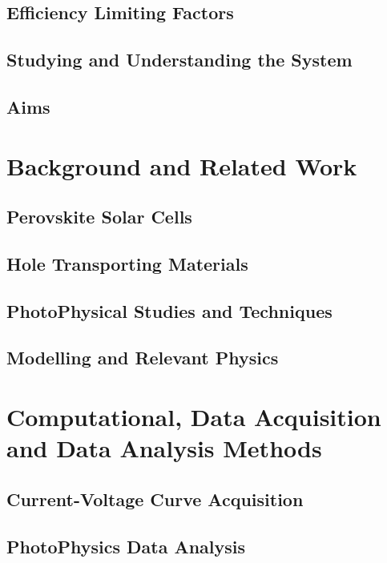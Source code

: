 \documentclass[a4paper, 12pt, openright]{book}
\begin{document}
	\section{Efficiency Limiting Factors}
	
	\section{Studying and Understanding the System}

	\section{Aims}

\chapter{Background and Related Work}

	\section{Perovskite Solar Cells}
	
	\section{Hole Transporting Materials}
	
	\section{PhotoPhysical Studies and Techniques}
	
	\section{Modelling and Relevant Physics}

\chapter{Computational, Data Acquisition and Data Analysis Methods}

	\section{Current-Voltage Curve Acquisition}

	\section{PhotoPhysics Data Analysis}
\end{document}
